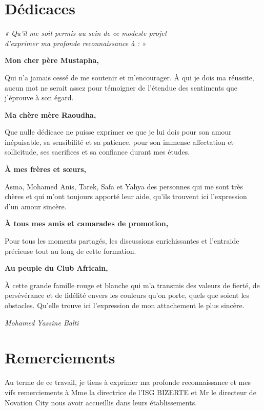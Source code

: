 \documentclass[12pt,a4paper]{report}
\begin{document}
\chapter*{Dédicaces}

\begin{center}
\textit{« Qu'il me soit permis au sein de ce modeste projet\\
d'exprimer ma profonde reconnaissance à : »}
\end{center}

\textbf{Mon cher père Mustapha,}

Qui n'a jamais cessé de me soutenir et m'encourager. À qui je dois ma réussite,
aucun mot ne serait assez pour témoigner de l'étendue des sentiments que j'éprouve à
son égard.

\textbf{Ma chère mère Raoudha,}

Que nulle dédicace ne puisse exprimer ce que je lui dois pour son amour inépuisable,
sa sensibilité et sa patience, pour son immense affectation et sollicitude, ses sacrifices
et sa confiance durant mes études.

\textbf{À mes frères et sœurs,}

Asma, Mohamed Anis, Tarek, Safa et Yahya des personnes qui me sont très chères
et qui m'ont toujours apporté leur aide, qu'ils trouvent ici l'expression d'un amour sincère.

\textbf{À tous mes amis et camarades de promotion,}

Pour tous les moments partagés, les discussions enrichissantes et l'entraide précieuse
tout au long de cette formation.

\textbf{Au peuple du Club Africain,}

À cette grande famille rouge et blanche qui m'a transmis des valeurs de fierté, de
persévérance et de fidélité envers les couleurs qu'on porte, quels que soient les
obstacles. Qu'elle trouve ici l'expression de mon attachement le plus sincère.

\hfill \textit{Mohamed Yassine Balti}

\chapter*{Remerciements}

Au terme de ce travail, je tiens à exprimer ma profonde reconnaissance et mes vifs
remerciements à Mme la directrice de l'ISG BIZERTE et Mr le directeur de Novation
City nous avoir accueillis dans leurs établissements.
\end{document}
